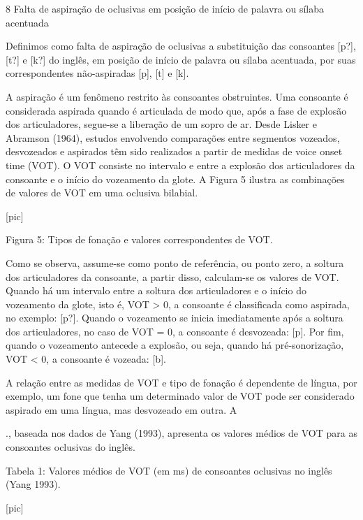 8 Falta de aspira\c{c}\~ao de oclusivas em posi\c{c}\~ao de in\'icio de palavra ou
s\'ilaba acentuada

Definimos como falta de aspira\c{c}\~ao de oclusivas a substitui\c{c}\~ao das
consoantes {[}p?{]}, {[}t?{]} e {[}k?{]} do ingl\^es, em posi\c{c}\~ao de in\'icio
de palavra ou s\'ilaba acentuada, por suas correspondentes n\~ao-aspiradas
{[}p{]}, {[}t{]} e {[}k{]}.

A aspira\c{c}\~ao \'e um fen\^omeno restrito às consoantes obstruintes. Uma
consoante \'e considerada aspirada quando \'e articulada de modo que, ap\'os a
fase de explos\~ao dos articuladores, segue-se a libera\c{c}\~ao de um sopro de
ar. Desde Lisker e Abramson (1964), estudos envolvendo compara\c{c}\~oes entre
segmentos vozeados, desvozeados e aspirados t\^em sido realizados a partir
de medidas de voice onset time (VOT). O VOT consiste no intervalo e
entre a explos\~ao dos articuladores da consoante e o in\'icio do vozeamento
da glote. A Figura 5 ilustra as combina\c{c}\~oes de valores de VOT em uma
oclusiva bilabial.

                                [pic]

    Figura 5: Tipos de fona\c{c}\~ao e valores correspondentes de VOT.

Como se observa, assume-se como ponto de refer\^encia, ou ponto zero, a
soltura dos articuladores da consoante, a partir disso, calculam-se os
valores de VOT. Quando h\'a um intervalo entre a soltura dos articuladores
e o in\'icio do vozeamento da glote, isto \'e, VOT \textgreater{} 0, a
consoante \'e classificada como aspirada, no exemplo: {[}p?{]}. Quando o
vozeamento se inicia imediatamente ap\'os a soltura dos articuladores, no
caso de VOT = 0, a consoante \'e desvozeada: {[}p{]}. Por fim, quando o
vozeamento antecede a explos\~ao, ou seja, quando h\'a pr\'e-sonoriza\c{c}\~ao, VOT
\textless{} 0, a consoante \'e vozeada: {[}b{]}.

A rela\c{c}\~ao entre as medidas de VOT e tipo de fona\c{c}\~ao \'e dependente de
l\'ingua, por exemplo, um fone que tenha um determinado valor de VOT pode
ser considerado aspirado em uma l\'ingua, mas desvozeado em outra. A

., baseada nos dados de Yang (1993), apresenta os valores m\'edios de VOT
para as consoantes oclusivas do ingl\^es.

        Tabela 1: Valores m\'edios de VOT (em ms) de consoantes
                  oclusivas no ingl\^es (Yang 1993).

                                [pic]

